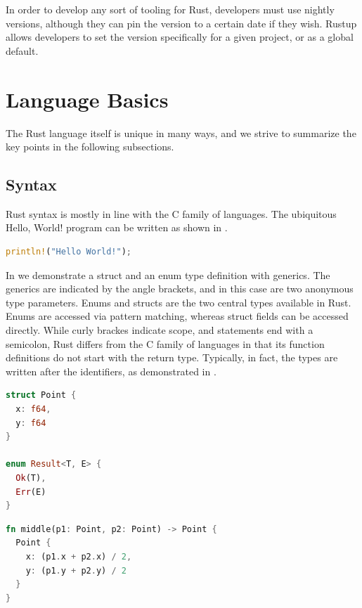\documentclass[paper=a4,%
  twoside,%
  BCOR4mm,%
  abstract=true,%
  toc=bibliography,%
  chapterprefix=true,%
  toc=bibliographynumbered,%
  open=right,%
  english,%
  pagesize=pdftex]{scrreprt}
\begin{document}
In order to develop any sort of tooling for Rust, developers must use nightly versions, although they can pin the version to a certain date if they wish.
Rustup allows developers to set the version specifically for a given project, or as a global default.

\section{Language Basics}
The Rust language itself is unique in many ways, and we strive to summarize the key points in the following subsections.

\subsection{Syntax}
Rust syntax is mostly in line with the C family of languages. The ubiquitous Hello, World! program can be written as shown in .
\begin{lstlisting}[language=Rust, style=boxed, caption=Hello World, label=lst:example-hello-world]
println!("Hello World!");
\end{lstlisting}

In  we demonstrate a struct and an enum type definition with generics. The generics are indicated by the angle brackets, and in this case are two anonymous type parameters. Enums and structs are the two central types available in Rust. Enums are accessed via pattern matching, whereas struct fields can be accessed directly. While curly brackes indicate scope, and statements end with a semicolon, Rust differs from the C family of languages in that its function definitions do not start with the return type. Typically, in fact, the types are written after the identifiers, as demonstrated in .

\begin{lstlisting}[language=Rust, style=boxed, caption={The type definition for a point in two-dimensional space and an enum definition}, label=lst:example-struct-enum]
struct Point {
  x: f64,
  y: f64
}

enum Result<T, E> {
  Ok(T),
  Err(E)
}
\end{lstlisting}


\begin{lstlisting}[language=Rust, style=boxed, caption={A function to compute the point between two points in two-dimensional space}, label=lst:example-functions-struct-enum]
fn middle(p1: Point, p2: Point) -> Point {
  Point {
    x: (p1.x + p2.x) / 2,
    y: (p1.y + p2.y) / 2
  }
}
\end{lstlisting}
\end{document}
